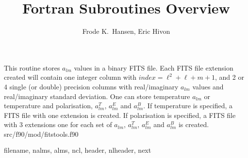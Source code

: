 
\sloppy


\title{\healpix Fortran Subroutines Overview}
 \section[alms2fits*]{ }
\label{sub:alms2fits}
\author{Frode K.~Hansen, Eric Hivon}

\begin{facility}
{This routine stores  $a_{lm}$  values in a binary FITS file. Each FITS file
  extension created will contain one integer column with
  $index=\ell^2+\ell+m+1$, and 2 or 4 single (or double) precision columns with real/imaginary  $a_{lm}$  values and real/imaginary   standard deviation. One can store temperature $a_{lm}$ or temperature and polarisation, $a^T_{lm}$, $a^E_{lm}$ and $a^B_{lm}$. If temperature is specified, a FITS file with one extension is created. If polarisation is specified, a FITS file with 3 extensions one for each set of $a_{lm}$, $a_{lm}^T$, $a_{lm}^E$ and $a_{lm}^B$ is created.}
{src/f90/mod/fitstools.f90}
\end{facility}

\begin{f90format}
{filename, nalms, alms, ncl, header, nlheader, next}
\end{f90format}


